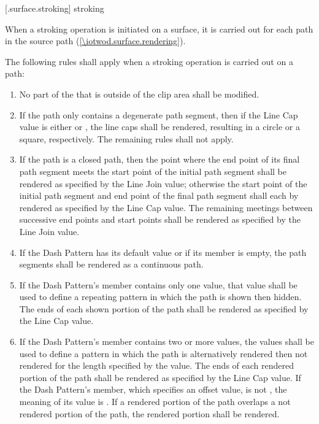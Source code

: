  [\iotwod.surface.stroking] { stroking}

\pnum
When a stroking operation is initiated on a surface, it is carried out for each path in the source path (\ref{\iotwod.surface.rendering}).

\pnum
The following rules shall apply when a stroking operation is carried out on a path:
\begin{enumerate}
\item No part of the \underlyingsurface that is outside of the clip area shall be modified.

\item If the path only contains a degenerate path segment, then if the Line Cap value is either  or , the line caps shall be rendered, resulting in a circle or a square, respectively. The remaining rules shall not apply.

\item If the path is a closed path, then the point where the end point of its final path segment meets the start point of the initial path segment shall be rendered as specified by the Line Join value; otherwise the start point of the initial path segment and end point of the final path segment shall each by rendered as specified by the Line Cap value. The remaining meetings between successive end points and start points shall be rendered as specified by the Line Join value.

\item If the Dash Pattern has its default value or if its  member is empty, the path segments shall be rendered as a continuous path.

\item If the Dash Pattern's  member contains only one value, that value shall be used to define a repeating pattern in which the path is shown then hidden. The ends of each shown portion of the path shall be rendered as specified by the Line Cap value.

\item If the Dash Pattern's  member contains two or more values, the values shall be used to define a pattern in which the path is alternatively rendered then not rendered for the length specified by the value. The ends of each rendered portion of the path shall be rendered as specified by the Line Cap value. If the Dash Pattern's  member, which specifies an offset value, is not , the meaning of its value is . If a rendered portion of the path overlaps a not rendered portion of the path, the rendered portion shall be rendered.
\end{enumerate}

